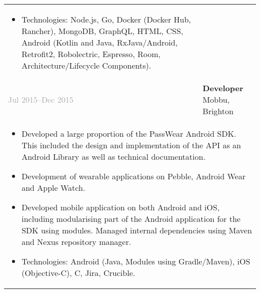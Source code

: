 \documentclass{article}
\newenvironment{exptable}{
  \begin{longtable}{lp{0.8\textwidth}}
  }{
  \end{longtable}
}
\begin{document}
\begin{exptable}
{        \vspace{1em}

        \begin{itemize}[leftmargin=1em]
          \item[] Technologies: Node.js, Go, Docker (Docker Hub, Rancher), MongoDB, GraphQL, HTML, CSS, Android (Kotlin and Java, RxJava/Android, Retrofit2, Robolectric, Espresso, Room, Architecture/Lifecycle Components).
        \end{itemize}
      } \\

      \clearpage

      \textcolor{darkgray}{Jul 2015--Dec 2015} & \textbf{Developer} Mobbu, Brighton \\
      \multicolumn{2}{p{\textwidth}}{
        \begin{itemize}
          \item Developed a large proportion of the PassWear Android SDK. This included the design and implementation of the API as an Android Library as well as technical documentation.
          \item Development of wearable applications on Pebble, Android Wear and Apple Watch.
          \item Developed mobile application on both Android and iOS, including modularising part of the Android application for the SDK using modules. Managed internal dependencies using Maven and Nexus repository manager.
        \end{itemize}

        \vspace{1em}

        \begin{itemize}[leftmargin=1em]
          \item[] Technologies: Android (Java, Modules using Gradle/Maven), iOS (Objective-C), C, Jira, Crucible.
        \end{itemize}
      } \\


\end{exptable}
\end{document}
